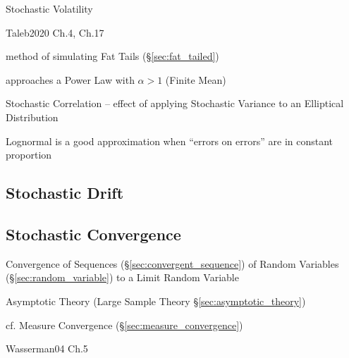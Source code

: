 Stochastic Volatility

Taleb2020 Ch.4, Ch.17

method of simulating Fat Tails (\S\ref{sec:fat_tailed})

approaches a Power Law with $\alpha > 1$ (Finite Mean)

Stochastic Correlation -- effect of applying Stochastic Variance to an
Elliptical Distribution

Lognormal is a good approximation when ``errors on errors'' are in constant
proportion



\subsection{Stochastic Drift}\label{sec:stochastic_drift}

\subsection{Stochastic Convergence}\label{sec:stochastic_convergence}

Convergence of Sequences (\S\ref{sec:convergent_sequence}) of Random Variables
(\S\ref{sec:random_variable}) to a Limit Random Variable

\fist Asymptotic Theory (Large Sample Theory \S\ref{sec:asymptotic_theory})

\fist cf. Measure Convergence (\S\ref{sec:measure_convergence})

Wasserman04 Ch.5

